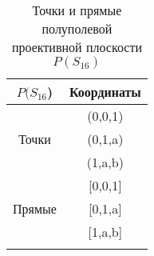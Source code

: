 
\begin{wraptable}{l}{4.0cm}
\caption{Точки и прямые полуполевой проективной плоскости $P(S_{16})$}
\label{tab:Stepanuk-1-tab-2}
\begin{tabular}{cc}
\toprule
$P(S_{16}$)                             & Координаты  \\
\midrule
\multicolumn{1}{c}{\multirow{3}{*}{Точки}} & (0,0,1)     \\
\multicolumn{1}{c}{}                       & (0,1,a)     \\
\multicolumn{1}{c}{}                       & (1,a,b)     \\
\multirow{3}{*}{Прямые}                    & {[}0,0,1{]} \\
                                           & {[}0,1,a{]} \\
                                           & {[}1,a,b{]} \\\bottomrule\\
\end{tabular}
\end{wraptable}
